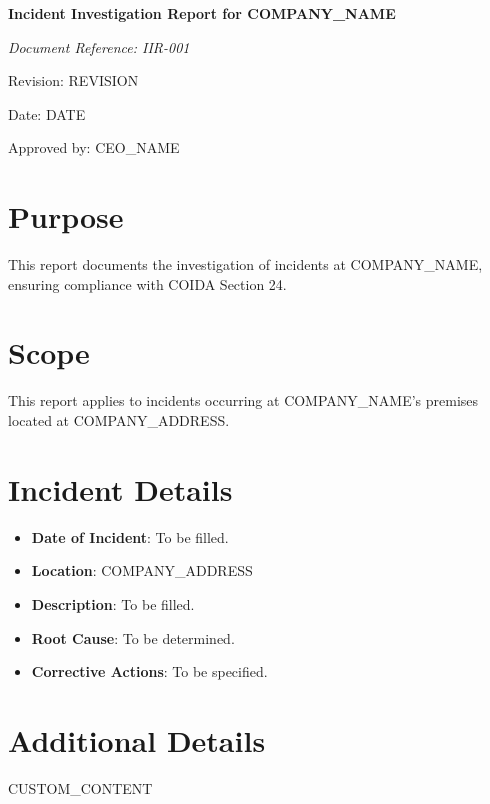 \documentclass[12pt]{article}
\begin{document}
\begin{titlepage}
    \centering
    \vspace*{2cm}
    {\LARGE\bfseries Incident Investigation Report for {{COMPANY_NAME}}\par}
    \vspace{1cm}
    {\large\itshape Document Reference: IIR-001\par}
    \vspace{0.5cm}
    {\normalsize Revision: {{REVISION}}\par}
    \vspace{0.5cm}
    {\normalsize Date: {{DATE}}\par}
    \vspace{2cm}
    {\normalsize Approved by: {{CEO_NAME}}\par}
\end{titlepage}

\section{Purpose}
This report documents the investigation of incidents at {{COMPANY_NAME}}, ensuring compliance with COIDA Section 24.

\section{Scope}
This report applies to incidents occurring at {{COMPANY_NAME}}'s premises located at {{COMPANY_ADDRESS}}.

\section{Incident Details}
\begin{itemize}
    \item \textbf{Date of Incident}: To be filled.
    \item \textbf{Location}: {{COMPANY_ADDRESS}}
    \item \textbf{Description}: To be filled.
    \item \textbf{Root Cause}: To be determined.
    \item \textbf{Corrective Actions}: To be specified.
\end{itemize}

\section{Additional Details}
{{CUSTOM_CONTENT}}
\end{document}
